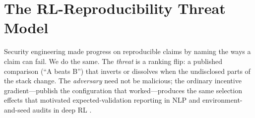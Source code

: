 \section{The RL-Reproducibility Threat Model}
\label{sec:p5-threat}
Security engineering made progress on reproducible claims by naming the ways a
claim can fail. We do the same. The \emph{threat} is a ranking flip: a
published comparison (``A beats B'') that inverts or dissolves when the
undisclosed parts of the stack change. The \emph{adversary} need not be
malicious; the ordinary incentive gradient---publish the configuration that
worked---produces the same selection effects that motivated expected-validation
reporting in NLP \citep{dodge2019show} and environment-and-seed audits in deep
RL \citep{henderson2018deep}.

